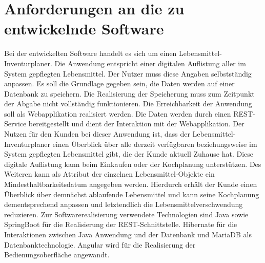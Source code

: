 \section{Anforderungen an die zu entwickelnde Software}
Bei der entwickelten Software handelt es sich um einen Lebensmittel-Inventurplaner.
Die Anwendung entspricht einer digitalen Auflistung aller im System gepflegten Lebensmittel. 
Der Nutzer muss diese Angaben selbstständig anpassen. 
Es soll die Grundlage gegeben sein, die Daten werden auf einer Datenbank zu speichern.
Die Realisierung der Speicherung muss zum Zeitpunkt der Abgabe nicht vollständig funktionieren. 
Die Erreichbarkeit der Anwendung soll als Webapplikation realisiert werden.
Die Daten werden durch einen \ac{REST}-Service bereitgestellt und dient der Interaktion mit der Webapplikation.
Der Nutzen für den Kunden bei dieser Anwendung ist, dass der Lebensmittel-Inventurplaner einen Überblick über alle derzeit verfügbaren beziehungsweise im System gepflegten Lebensmittel gibt, die der Kunde aktuell Zuhause hat. 
Diese digitale Auflistung kann beim Einkaufen oder der Kochplanung unterstützen. 
Des Weiteren kann als Attribut der einzelnen Lebensmittel-Objekte ein Mindesthaltbarkeitsdatum angegeben werden. 
Hierdurch erhält der Kunde einen Überblick über demnächst ablaufende Lebensmittel und kann seine Kochplanung dementsprechend anpassen und letztendlich die Lebensmittelverschwendung reduzieren.
Zur Softwarerealisierung verwendete Technologien sind Java sowie SpringBoot für die Realisierung der \ac{REST}-Schnittstelle. Hibernate für die Interaktionen zwischen Java Anwendung und der Datenbank und MariaDB als Datenbanktechnologie. 
Angular wird für die Realisierung der Bedienungsoberfläche angewandt.
